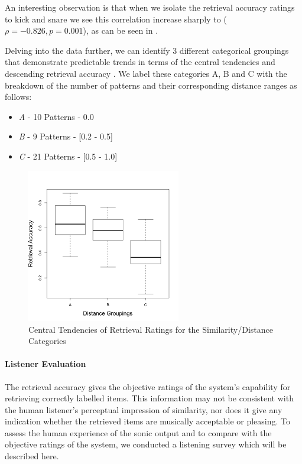 An interesting observation is that when we isolate the retrieval accuracy ratings to kick and snare we see this correlation increase sharply to ($\rho = -0.826, p = 0.001$), as can be seen in .

Delving into the data further, we can identify 3 different categorical groupings that demonstrate predictable trends in terms of the central tendencies and descending retrieval accuracy . We label these categories A, B and C with the breakdown of the number of patterns and their corresponding distance ranges as follows:

\begin{itemize}
  \item \textit{A} - 10 Patterns - 0.0
  \item \textit{B} - 9 Patterns - [0.2 - 0.5]
  \item \textit{C} - 21 Patterns - [0.5 - 1.0]
\end{itemize}

\begin{figure}
	\begin{center}
		\includegraphics[width=0.6\textwidth]{ch07_evaluation/figures/new_retrieval_plot.png}
	\end{center}
	\caption[Central Tendencies of Retrieval Ratings for the Similarity/Distance Categories
]{Central Tendencies of Retrieval Ratings for the Similarity/Distance Categories}
	\label{fig:central_tendencies}
\end{figure}

\paragraph{Listener Evaluation}

The retrieval accuracy gives the objective ratings of the system’s capability for retrieving correctly labelled items. This information may not be consistent with the human listener’s perceptual impression of similarity, nor does it give any indication whether the retrieved items are musically acceptable or pleasing. To assess the human experience of the sonic output and to compare with the objective ratings of the system, we conducted a listening survey which will be described here.

